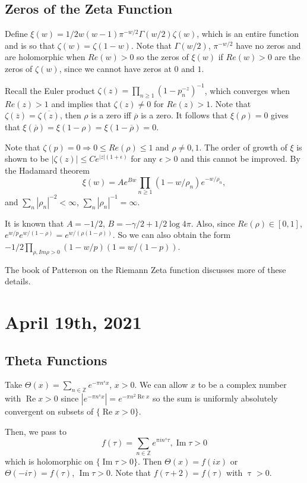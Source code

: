 \documentclass[12pt]{scrartcl}
\newcommand{\Z}{\mathbb{Z}}
\let \ol \overline
\begin{document}
\subsection{Zeros of the Zeta Function}
Define $\xi(w) = 1/2 w(w-1) \pi^{-w/2} \Gamma(w/2) \zeta(w)$, which is an entire function and is so that $\zeta(w) = \zeta(1-w)$.  Note that $\Gamma(w/2)$, $\pi^{-w/2}$ have no zeros and are holomorphic when $Re(w)> 0$ so the zeros of $\xi(w)$ if $Re(w) > 0$ are the zeros of $\zeta(w)$, since we cannot have zeros at $0$ and $1$.

Recall the Euler product $\zeta(z) = \prod_{n \ge 1} (1 - p_n^{-z})^{-1}$, which converges when $Re(z) > 1$ and implies that $\zeta(z) \ne 0$ for $Re(z) > 1$.  Note that $\zeta(\ol{z}) = \ol{\zeta(z)}$, then $\rho$ is a zero iff $\ol{\rho}$ is a zero.  It follows that $\xi(\rho) = 0$ gives that $\xi(\ol{\rho}) = \xi(1-\rho) = \xi(1 - \ol{\rho}) = 0$.

Note that $\zeta(p) = 0 \Rightarrow 0 \le Re(\rho) \le 1$ and $\rho \ne 0, 1$.  The order of growth of $\xi$ is shown to be $|\zeta(z)| \le Ce^{|z|(1 + \epsilon)}$ for any $\epsilon > 0$ and this cannot be improved.  By the Hadamard theorem
$$\xi(w) = Ae^{Bw} \prod_{n \ge 1} (1 - w/\rho_n) e^{-w/\rho_n},$$
and 
$\sum_{n} |\rho_n|^{-2} < \infty$, $\sum_{n} |\rho_n|^{-1} = \infty$.

It is known that $A = -1/2$, $B = -\gamma/2 + 1/2 \log{4\pi}$.  Also, since $Re(\rho) \in [0, 1]$, $e^{w/p} e^{w/(1-\rho)} = e^{w/(\rho(1-\rho))}$.  So we can also obtain the form $-1/2 \prod_{\rho, Im \rho > 0} (1-w/p)(1=w/(1-p)).$

The book of Patterson on the Riemann Zeta function discusses more of these details.  
\pagebreak
\section{April 19th, 2021}
\subsection{Theta Functions}
Take $\Theta(x) = \sum_{n \in \Z} e^{-\pi n^s x}$, $x > 0$.  We can allow $x$ to be a complex number with $\operatorname{Re}{x} > 0$ since $|e^{-\pi n^s x}| = e^{-\pi n^2 \operatorname{Re}{x}}$ so the sum is uniformly absolutely convergent on subsets of $\{\operatorname{Re}{x} > 0\}$.

Then, we pass to $$f(\tau) = \sum_{n \in \Z} e^{\pi i n^s \tau}, \operatorname{Im}{\tau} > 0$$
which is holomorphic on $\{\operatorname{Im}{\tau} > 0\}$.  Then $\Theta(x) = f(ix)$ or $\Theta(-i\tau) = f(\tau)$, $\operatorname{Im}{\tau} > 0$.  Note that $f(\tau + 2) = f(\tau)$ with $\operatorname{\tau} > 0$.
\end{document}
